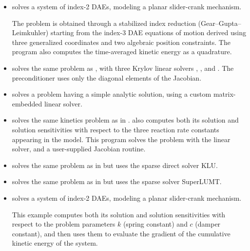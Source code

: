 \begin{itemize}
  The PDEs are discretized in space to a system of DAEs which are solved
  using the {\sunlinsolband} linear solver with the default difference-quotient 
  Jacobian approximation.

\item {}
  solves a system of index-2 DAEs, modeling a planar slider-crank mechanism.

  The problem is obtained through a stabilized index reduction (Gear--Gupta--Leimkuhler)
  starting from the index-3 DAE equations of motion derived using three generalized
  coordinates and two algebraic position constraints.
  The program also computes the time-averaged kinetic energy as a quadrature.

\item {}
  solves the same problem as , with three Krylov linear solvers
  {\sunlinsolspgmr}, {\sunlinsolspbcgs}, and {\sunlinsolsptfqmr}.  The preconditioner uses only
  the diagonal elements of the Jacobian.

\item {} solves a problem having a simple analytic
  solution, using a custom matrix-embedded linear solver.  
  

\item {}
  solves the same kinetics problem as in .
  \newline
  {\idas} also computes both its solution and solution sensitivities with respect
  to the three reaction rate constants appearing in the model. 
  This program solves the problem with the {\sunlinsoldense} linear solver, and a 
  user-supplied Jacobian routine.

\item {}
  solves the same problem as in  but uses
  the sparse direct solver KLU.

\item {}
  solves the same problem as in  but uses
  the sparse solver SuperLUMT.

\item {}
  solves a system of index-2 DAEs, modeling a planar slider-crank mechanism.

  This example computes both its solution and solution sensitivities with respect
  to the problem parameters $k$ (spring constant) and $c$ (damper constant), 
  and then uses them to evaluate the gradient of the cumulative kinetic energy
  of the system.


\end{itemize}
